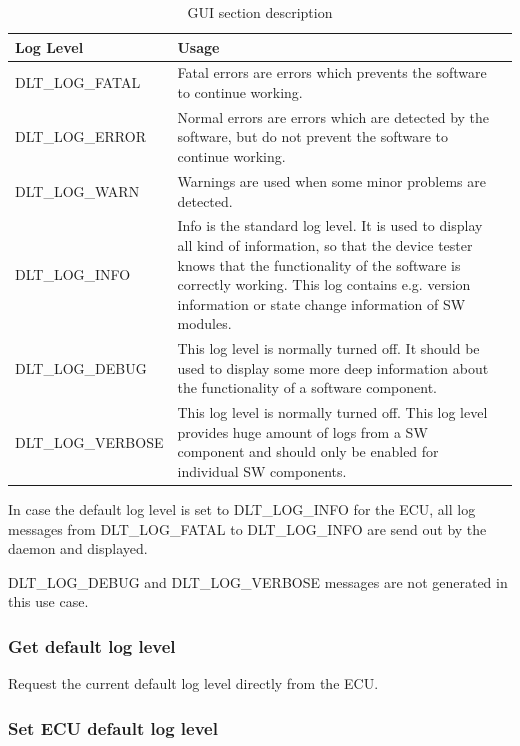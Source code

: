 \documentclass[a4paper,11pt]{article}
\begin{document}
\begin{longtable}{| l | m{11cm}  | m{11cm} |}
\caption[GUI section description]{GUI section description} \label{guisectiondescription} \\
 \hline
   \textbf{Log Level} & \textbf{Usage} \\
\hline
   DLT\_LOG\_FATAL
   &
   Fatal errors are errors which prevents the software to continue working. \\
   \hline
   DLT\_LOG\_ERROR
   &
   Normal errors are errors which are detected by the software, but do not
   prevent the software to continue working. \\
   \hline
   DLT\_LOG\_WARN
   &
   Warnings are used when some minor problems are detected. 
   \\
   \hline
    DLT\_LOG\_INFO
   &
   Info is the standard log level. It is used to display all kind of
   information, so that the device tester knows that the functionality of the
   software is correctly working. This log contains e.g. version
   information or state change information of SW modules. \\
   \hline
   DLT\_LOG\_DEBUG 
   &
   This log level is normally turned off. It should be used to
   display some more deep information about the functionality of a
   software component. \\
   \hline
   DLT\_LOG\_VERBOSE
   &
   This log level is normally turned off. This log level provides huge
   amount of logs from a SW component and should only be
   enabled for individual SW components. \\
   \hline

\end{longtable}


In case the default log level is set to DLT\_LOG\_INFO for the ECU, all log messages from
DLT\_LOG\_FATAL to DLT\_LOG\_INFO are send out by the daemon and displayed. 

DLT\_LOG\_DEBUG and DLT\_LOG\_VERBOSE messages are not generated in this use case.


\subsubsection{Get default log level}

Request the current default log level directly from the ECU.

\subsubsection{Set ECU default log level}
\end{document}
